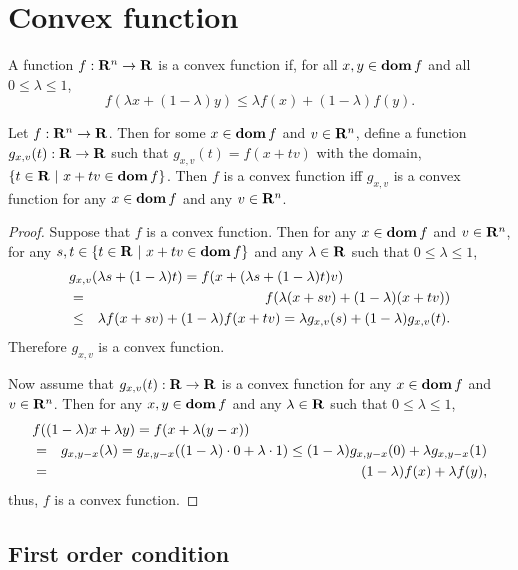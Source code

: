 \section{Convex function}

A function $f:\mathbf{R}^n\to\mathbf{R}$ is a convex function if, for all $x,y \in \mathop{\bf dom} f$ and all $0\leq \lambda \leq 1$,
\begin{equation}
f(\lambda x + (1-\lambda)y)
\leq
\lambda f(x) + (1-\lambda)f(y).
\end{equation}

\begin{theorem}
\label{theorem:cvx-equiv-1d-fcn}
Let $f:\mathbf{R}^n\to\mathbf{R}$.
Then for some $x\in\mathop{\bf dom} f$ and $v\in\mathbf{R}^n$,
define a function $g_{x,v}(t):\mathbf{R}\to\mathbf{R}$ such that $g_{x,v}(t) = f(x+tv)$
with the domain, $\{t\in\mathbf{R}~|~x+tv\in \mathop{\bf dom} f\}$.
Then $f$ is a convex function iff $g_{x,v}$ is a convex function for any $x\in\mathop{\bf dom} f$ and any $v\in\mathbf{R}^n$.
\end{theorem}

\begin{proof}
Suppose that $f$ is a convex function.
Then for any $x\in\mathop{\bf dom} f$ and $v\in\mathbf{R}^n$,
for any $s,t \in\{t\in\mathbf{R}~|~x+tv\in \mathop{\bf dom} f\}$ and any $\lambda\in\mathbf{R}$ such that $0\leq \lambda \leq 1$,
\begin{eqnarray*}
\lefteqn{
g_{x,v}(\lambda s + (1-\lambda) t)
=f(x+(\lambda s + (1-\lambda) t)v)
}
\\
&=&
f(\lambda (x+sv) + (1-\lambda) (x+tv))
\\
&\leq&
\lambda f(x+sv) + (1-\lambda) f(x+tv)
= \lambda g_{x,v}(s) + (1-\lambda) g_{x,v}(t).
\end{eqnarray*}
Therefore $g_{x,v}$ is a convex function.

Now assume that
$g_{x,v}(t):\mathbf{R}\to\mathbf{R}$ is a convex function for any $x\in\mathop{\bf dom} f$ and $v\in\mathbf{R}^n$.
Then for any $x,y \in \mathop{\bf dom} f$ and any $\lambda\in\mathbf{R}$ such that $0\leq \lambda \leq 1$,
\begin{eqnarray*}
\lefteqn{
f((1-\lambda) x + \lambda y ) =f(x + \lambda (y-x) )
}
\\
&=&
g_{x,y-x}(\lambda)
= g_{x,y-x}((1-\lambda)\cdot 0 + \lambda \cdot 1)
\leq (1-\lambda) g_{x,y-x}(0) + \lambda g_{x,y-x}(1)
\\
&=&
(1-\lambda) f(x) + \lambda f(y),
\end{eqnarray*}
thus, $f$ is a convex function.
\end{proof}

\subsection{First order condition}

